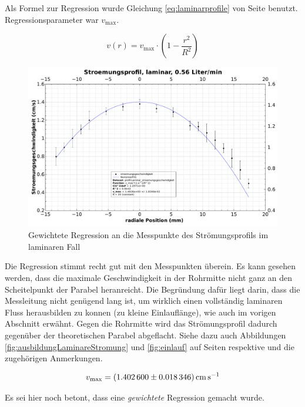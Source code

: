 \clearpage
\begin{samepage}
Als   Formel   zur    Regression   wurde   Gleichung   \ref{eq:laminarprofile}
von   Seite   \pageref{eq:laminarprofile}  benutzt. Regressionsparameter   war
$v_{\mathrm{max}}$.

\begin{equation}
    \label{eq:laminarprofile:auswertung}
    v(r) = v_{\mathrm{max}} \cdot \left( 1 - \frac{r^2}{R^2} \right)
\end{equation}

\begin{figure}[h!t]
    \centering
    \includegraphics[width=\textwidth]{images/profil-laminar.pdf}
    \caption{Gewichtete Regression an die Messpunkte des Str\"omungsprofils im laminaren Fall}
    \label{fig:profile:laminar}
\end{figure}

Die  Regression  stimmt  recht  gut mit  den  Messpunkten  \"uberein. Es  kann
gesehen  werden, dass  die  maximale Geschwindigkeit  in  der Rohrmitte  nicht
ganz an  den Scheitelpunkt  der Parabel heranreicht. Die  Begr\"undung daf\"ur
liegt  darin, dass  die Messleitung  nicht  gen\"ugend lang  ist, um  wirklich
einen  vollst\"andig  laminaren  Fluss   herausbilden  zu  konnen  (zu  kleine
Einlaufl\"ange), wie auch im  vorigen Abschnitt erw\"ahnt. Gegen die Rohrmitte
wird  das Str\"omungsprofil  dadurch   gegen\"uber  der theoretischen  Parabel
abgeflacht. Siehe  dazu auch  Abbildungen \ref{fig:ausbildungLaminareStromung}
und  \ref{fig:einlauf}   auf  Seiten  \pageref{fig:ausbildungLaminareStromung}
respektive \pageref{fig:einlauf} und die zugeh\"origen Anmerkungen.

\begin{equation}
    \label{eq:profile:laminar:regression:results:vmax}
    v_{\mathrm{max}} = \SI{1.4026 \pm 0.018346}{\centi\meter\per\second}
\end{equation}

Es sei hier noch betont, dass eine \emph{gewichtete} Regression gemacht wurde.
\end{samepage}

